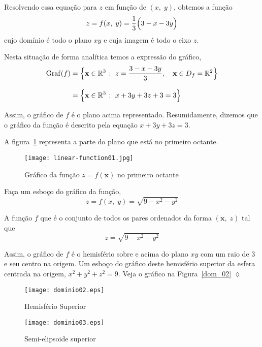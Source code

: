 Resolvendo essa equação para \(z\) em função de \((x,\; y)\), obtemos a função 
\begin{equation*}
	z= f(x,\; y) = \dfrac{1}{3}\Bigl(3-x-3y\Bigr) 
\end{equation*}
cujo domínio é todo o plano \(xy\) e cuja imagem é todo o eixo \(z\).

Nesta situação de forma analítica temos a expressão do gráfico,
\begin{align*}
	\mathrm{Graf}(f)&=\Bigl\{\mathbf{x} \in \mathbb{R}^{3}\; \colon\; z=\dfrac{3-x-3y}{3},\quad \mathbf{x} \in D_{f}=\mathbb{R}^{2} \Bigr\}\\[2ex]
	& = \Bigl\{\mathbf{x} \in \mathbb{R}^{3}\; \colon\; x+3y+3z+3=3\Bigr\}
\end{align*}

Assim, o gráfico de \(f\) é o plano acima representado. Resumidamente, dizemos que o gráfico da função é descrito pela equação \(x + 3y + 3z = 3\). 

A figura~\ref{fig:1-8-1} representa a parte do plano que está no primeiro octante.
\begin{figure}[H]
	\centering
	\texttt{[image: linear-function01.jpg]}
	\caption{Gráfico da função \(z=f(\mathbf{x})\) no primeiro octante}
	\label{fig:1-8-1}
\end{figure}

\begin{exer}
	Faça um esboço do gráfico da função,
	\begin{equation*}
		z=f(x,\; y)=\sqrt{9-x^2-y^2}
	\end{equation*}
\end{exer}

\solo
A função \(f\) que é o conjunto de todos os pares ordenados da forma \((\mathbf{x},\; z)\) tal que
\begin{equation*}
	z = \sqrt{9-x^{2}-y^{2}}
\end{equation*}

Assim, o gráfico de \(f\) é o hemisfério sobre e acima do plano \(xy\) com um raio de \(3\) e seu centro na origem. Um esboço do gráfico deste hemisfério 
superior da esfera centrada na origem, $x^{2}+y^{2}+z^{2}=9$. Veja o gráfico na Figura~\ref{dom_02}
\hfill \(\lozenge\)
%
\begin{figure}[H]
	\centering
	\begin{minipage}[t]{0.5\linewidth}
		\texttt{[image: dominio02.eps]}
		\caption{Hemisfério Superior}
		\label{dom_02}
	\end{minipage}%
	\begin{minipage}[t]{0.5\linewidth}
		\texttt{[image: dominio03.eps]}
		\caption{Semi-elipsoide superior}
		\label{dom_03}
	\end{minipage}
\end{figure}
%

